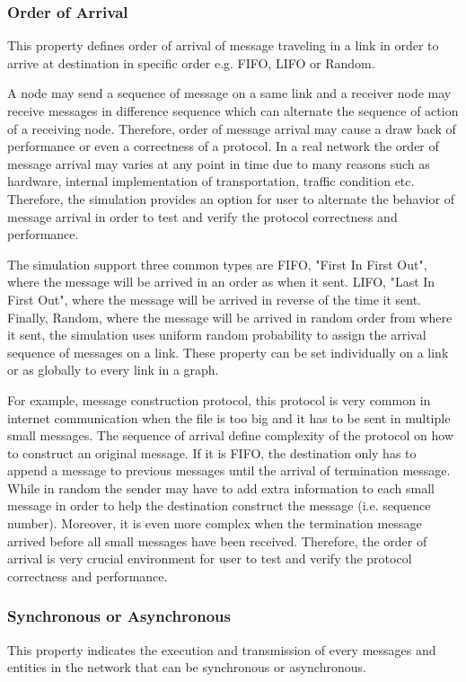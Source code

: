 \subsubsection*{Order of Arrival}
This property defines order of arrival of message traveling in a link in order to arrive at destination in specific order e.g. FIFO, LIFO or Random.

A node may send a sequence of message on a same link and a receiver node may receive messages in difference sequence which can alternate the sequence of action of a receiving node. Therefore, order of message arrival may cause a draw back of performance or even a correctness of a protocol. In a real network the order of message arrival may varies at any point in time due to many reasons such as hardware, internal implementation of transportation, traffic condition etc. Therefore, the simulation provides an option for user to alternate the behavior of message arrival in order to test and verify the protocol correctness and performance.

The simulation support three common types are FIFO, "First In First Out", where the message will be arrived in an order as when it sent. LIFO, "Last In First Out", where the message will be arrived in reverse of the time it sent. Finally, Random, where the message will be arrived in random order from where it sent, the simulation uses uniform random probability to assign the arrival sequence of messages on a link. These property can be set individually on a link or as globally to every link in a graph.

For example, message construction protocol, this protocol is very common in internet communication when the file is too big and it has to be sent in multiple small messages. The sequence of arrival define complexity of the protocol on how to construct an original message. If it is FIFO, the destination only has to append a message to previous messages until the arrival of termination message. While in random the sender may have to add extra information to each small message in order to help the destination construct the message (i.e. sequence number). Moreover, it is even more complex when the termination message arrived before all small messages have been received. Therefore, the order of arrival is very crucial environment for user to test and verify the protocol correctness and performance.


\subsubsection*{Synchronous or Asynchronous}
This property indicates the execution and transmission of every messages and entities in the network that can be synchronous or asynchronous.

